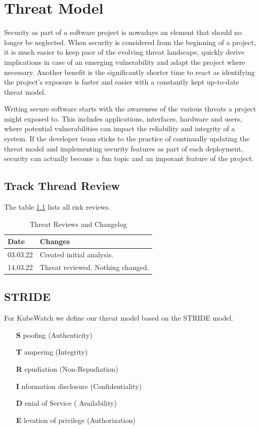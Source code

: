 \chapter{Threat Model}

Security as part of a software project is nowadays an element that should no longer be neglected. When security is considered from the beginning of a project, it is much easier to keep pace of the evolving threat landscape, quickly derive implications in case of an emerging vulnerability and adapt the project where necessary. Another benefit is the significantly shorter time to react as identifying the project's exposure is faster and easier with a constantly kept up-to-date threat model.

Writing secure software starts with the awareness of the various threats a project might exposed to. This includes applications, interfaces, hardware and users, where potential vulnerabilities can impact the reliability and integrity of a system. If the developer team sticks to the practice of continually updating the threat model and implementing security features as part of each deployment, security can actually become a fun topic and an imporant feature of the project.

\section{Track Thread Review}
The table \ref{tab:threat-review} lists all risk reviews.

\begin{table}[h!]
  \centering
  \caption{\label{tab:threat-review}Threat Reviews and Changelog}
  \begin{tabular}{ | l | l | }
    \hline
    \textbf{Date} & \textbf{Changes} \\
    \hline
    03.03.22 & Created initial analysis. \\
    \hline
    14.03.22 & Threat reviewed. Nothing changed. \\
    \hline
  \end{tabular}
\end{table}

\section{STRIDE}

For KubeWatch we define our threat model based on the STRIDE model.
\begin{itemize}
    \item [{\bfseries S}]poofing (Authenticity)
    \item [{\bfseries T}]ampering (Integrity)
    \item [{\bfseries R}]epudiation (Non-Repudiation)
    \item [{\bfseries I}]nformation disclosure (Confidentiality)
    \item [{\bfseries D}]enial of Service ( Availability)
    \item [{\bfseries E}]levation of privilege (Authorization)
\end{itemize}


